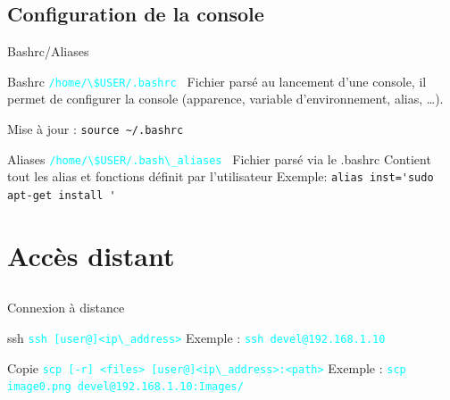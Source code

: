 \documentclass{beamer}
\begin{document}
\subsection{Configuration de la console}

\begin{frame}[fragile]{Bashrc/Aliases}
\begin{block}{Bashrc}
\textcolor{cyan}{\verb?/home/\$USER/.bashrc ?} \linebreak
Fichier parsé au lancement d'une console, il permet de configurer la console (apparence, variable d'environnement, alias, \dots ).

Mise à jour : \verb?source ~/.bashrc?
\end{block}
\begin{block}{Aliases}
\textcolor{cyan}{\verb?/home/\$USER/.bash\_aliases ?} \linebreak 
Fichier parsé via le .bashrc\linebreak
Contient tout les alias et fonctions définit par l'utilisateur
Exemple: \verb?alias inst='sudo apt-get install '?
\end{block}
\end{frame}



\section{Accès distant}

\subsection{}

\begin{frame}[fragile]{Connexion à distance}
\begin{block}{ssh}
\textcolor{cyan}{\verb?ssh [user@]<ip\_address>?} \linebreak
Exemple : \linebreak
\textcolor{cyan}{\verb?ssh devel@192.168.1.10?}
\end{block}

\begin{block}{Copie}
\textcolor{cyan}{\verb?scp [-r] <files> [user@]<ip\_address>:<path>?} \linebreak
Exemple : \linebreak
\textcolor{cyan}{\verb?scp image0.png devel@192.168.1.10:Images/?}
\end{block}
\end{frame}
\end{document}
